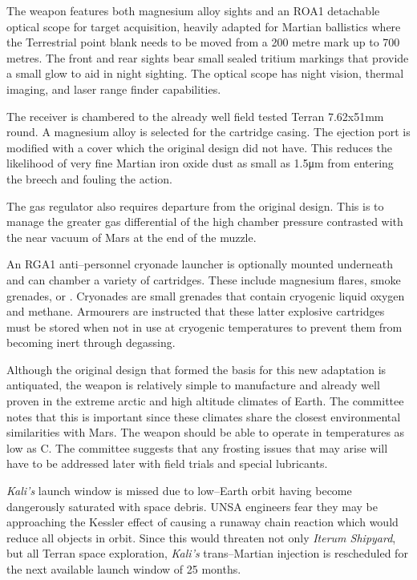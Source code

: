 The weapon features both magnesium alloy sights and an ROA1 detachable optical scope for target acquisition, heavily adapted for Martian ballistics where the Terrestrial point blank needs to be moved from a 200 metre mark up to 700 metres. The front and rear sights bear small sealed tritium markings that provide a small glow to aid in night sighting. The optical scope has night vision, thermal imaging, and laser range finder capabilities.

The receiver is chambered to the already well field tested Terran 7.62x51mm round. A magnesium alloy is selected for the cartridge casing. The ejection port is modified with a cover which the original design did not have. This reduces the likelihood of very fine Martian iron oxide dust as small as 1.5μm from entering the breech and fouling the action.

The gas regulator also requires departure from the original design. This is to manage the greater gas differential of the high chamber pressure contrasted with the near vacuum of Mars at the end of the muzzle.

An RGA1 anti--personnel cryonade launcher is optionally mounted underneath and can chamber a variety of cartridges. These include magnesium flares, smoke grenades, or . Cryonades are small grenades that contain cryogenic liquid oxygen and methane. Armourers are instructed that these latter explosive cartridges must be stored when not in use at cryogenic temperatures to prevent them from becoming inert through degassing.

Although the original design that formed the basis for this new adaptation is antiquated, the weapon is relatively simple to manufacture and already well proven in the extreme arctic and high altitude climates of Earth. The committee notes that this is important since these climates share the closest environmental similarities with Mars. The weapon should be able to operate in temperatures as low as C. The committee suggests that any frosting issues that may arise will have to be addressed later with field trials and special lubricants.
\StopTimelineDate

{\it Kali's} launch window is missed due to low--Earth orbit having become dangerously saturated with space debris. UNSA engineers fear they may be approaching the Kessler effect of causing a runaway chain reaction which would reduce all objects in orbit. Since this would threaten not only {\it Iterum Shipyard}, but all Terran space exploration, {\it Kali's} trans--Martian injection is rescheduled for the next available launch window of 25 months.
\StopTimelineDate

